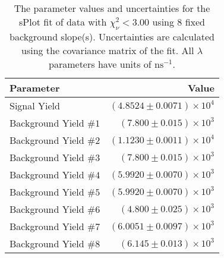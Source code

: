
\begin{table}
    \begin{center}
        \begin{tabular}{lr}\toprule
            Parameter & Value \\\midrule
            Signal Yield & $(4.8524 \pm 0.0071) \times 10^{4}$ \\
            Background Yield $\#1$ & $(7.800 \pm 0.015) \times 10^{3}$ \\
            Background Yield $\#2$ & $(1.1230 \pm 0.0011) \times 10^{4}$ \\
            Background Yield $\#3$ & $(7.800 \pm 0.015) \times 10^{3}$ \\
            Background Yield $\#4$ & $(5.9920 \pm 0.0070) \times 10^{3}$ \\
            Background Yield $\#5$ & $(5.9920 \pm 0.0070) \times 10^{3}$ \\
            Background Yield $\#6$ & $(4.800 \pm 0.025) \times 10^{3}$ \\
            Background Yield $\#7$ & $(6.0051 \pm 0.0097) \times 10^{3}$ \\
            Background Yield $\#8$ & $(6.145 \pm 0.013) \times 10^{3}$ \\\bottomrule
        \end{tabular}
        \caption{The parameter values and uncertainties for the sPlot fit of data with $\chi^2_\nu < 3.00$ using 8 fixed background slope(s). Uncertainties are calculated using the covariance matrix of the fit. All $\lambda$ parameters have units of $\si{\nano\second}^{-1}$.}
    \end{center}
\end{table}
